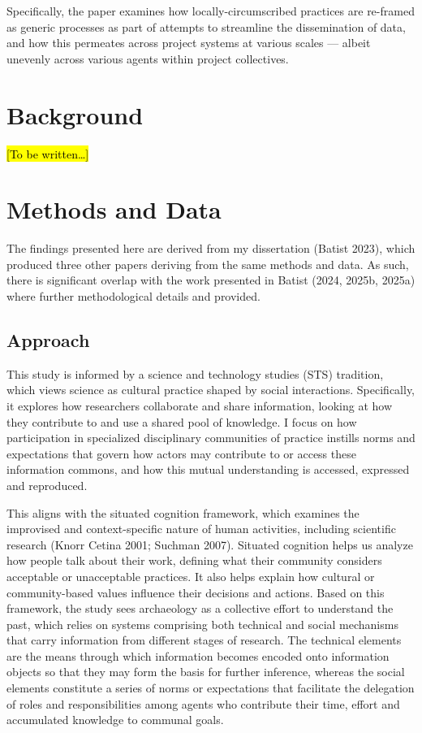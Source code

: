 \documentclass[
  canadian,
]{article}
\begin{document}
Specifically, the paper examines how locally-circumscribed practices are
re-framed as generic processes as part of attempts to streamline the
dissemination of data, and how this permeates across project systems at
various scales --- albeit unevenly across various agents within project
collectives.

\section{Background}\label{background}

\hl{{[}To be written\ldots{]}}

\section{Methods and Data}\label{methods-and-data}

The findings presented here are derived from my dissertation (Batist
2023), which produced three other papers deriving from the same methods
and data. As such, there is significant overlap with the work presented
in Batist (2024, 2025b, 2025a) where further methodological details and
provided.

\subsection{Approach}\label{approach}

This study is informed by a science and technology studies (STS)
tradition, which views science as cultural practice shaped by social
interactions. Specifically, it explores how researchers collaborate and
share information, looking at how they contribute to and use a shared
pool of knowledge. I focus on how participation in specialized
disciplinary communities of practice instills norms and expectations
that govern how actors may contribute to or access these information
commons, and how this mutual understanding is accessed, expressed and
reproduced.

This aligns with the situated cognition framework, which examines the
improvised and context-specific nature of human activities, including
scientific research (Knorr Cetina 2001; Suchman 2007). Situated
cognition helps us analyze how people talk about their work, defining
what their community considers acceptable or unacceptable practices. It
also helps explain how cultural or community-based values influence
their decisions and actions. Based on this framework, the study sees
archaeology as a collective effort to understand the past, which relies
on systems comprising both technical and social mechanisms that carry
information from different stages of research. The technical elements
are the means through which information becomes encoded onto information
objects so that they may form the basis for further inference, whereas
the social elements constitute a series of norms or expectations that
facilitate the delegation of roles and responsibilities among agents who
contribute their time, effort and accumulated knowledge to communal
goals.
\end{document}

